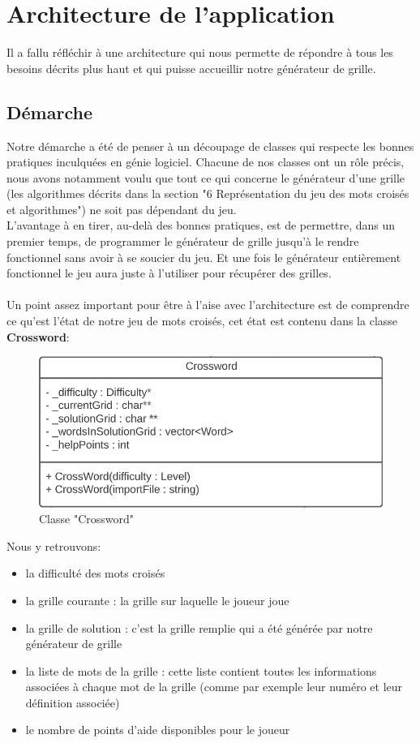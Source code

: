 \documentclass [ 11 pt ] {article}
\begin{document}
\section{Architecture de l’application}

Il a fallu réfléchir à une architecture qui nous permette de répondre à tous les besoins décrits plus haut et qui puisse accueillir notre générateur de grille.

\subsection{Démarche}
    Notre démarche a été de penser à un découpage de classes qui respecte les bonnes pratiques inculquées en génie logiciel. Chacune de nos classes ont un rôle précis, nous avons notamment voulu que tout ce qui concerne le générateur d’une grille (les algorithmes décrits dans la section "6 Représentation du jeu des mots croisés et algorithmes") ne soit pas dépendant du jeu.\\ 
    L’avantage à en tirer, au-delà des bonnes pratiques, est de permettre, dans un premier temps, de programmer le générateur de grille jusqu’à le rendre fonctionnel sans avoir à se soucier du jeu. Et une fois le générateur entièrement fonctionnel le jeu aura juste à l’utiliser pour récupérer des grilles.
    \\\\
    Un point assez important pour être à l’aise avec l’architecture est de comprendre ce qu'est l’état de notre jeu de mots croisés, cet état est contenu dans la classe \textbf{Crossword}:
    \begin{figure}[H] 
    \center 
    \includegraphics[width=0.5\linewidth]{crossword_uml.png}
    \caption{Classe "Crossword"}
    \end{figure}
    Nous y retrouvons:
    \begin{itemize}
        \item la difficulté des mots croisés
        \item la grille courante : la grille sur laquelle le joueur joue
        \item la grille de solution : c’est la grille remplie qui a été générée par notre générateur de grille
        \item la liste de mots de la grille : cette liste contient toutes les informations associées à chaque mot de la grille (comme par exemple leur numéro et leur définition associée)
        \item le nombre de points d’aide disponibles pour le joueur
    \end{itemize}
    
\end{document}
